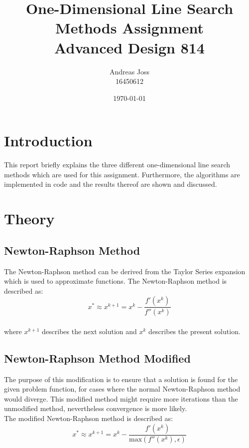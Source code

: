 \documentclass[a4paper,10pt]{article}
\title{\Huge{One-Dimensional Line Search Methods Assignment}\\[7cm]Advanced Design 814\\[2cm]}
\author{\Large Andreas Joss\\[0.5cm]16450612}
\date{\today}
\begin{document}
\maketitle


\newpage
\section{Introduction}
This report briefly explains the  three different one-dimensional line search methods which are used for this assignment. Furthermore, the algorithms are implemented in code and the results thereof are shown and discussed. 

\section{Theory}
\subsection{Newton-Raphson Method}
The Newton-Raphson method can be derived from the Taylor Series expansion which is used to approximate functions. The Newton-Raphson method is described as:
 \begin{equation}\label{eq:4}
  x^{*} \approx x^{k+1} = x^{k} - \frac{f'(x^{k})}{f''(x^{k})}
 \end{equation}
\\[0.5cm]

where $x^{k+1}$ describes the next solution and $x^{k}$ describes the present solution.

\subsection{Newton-Raphson Method Modified}
The purpose of this modification is to ensure that a solution is found for the given problem function, for cases where the normal Newton-Raphson method would diverge. This modified method might require more iterations than the unmodified method, nevertheless convergence is more likely.
\\[0.5cm]
The modified Newton-Raphson method is described as:
 \begin{equation}\label{eq:2}
  x^{*} \approx x^{k+1} = x^{k} - \frac{f'(x^{k})}{\text{max}(f''(x^{k}),\epsilon)}
 \end{equation}
\\[0.1cm]
\end{document}
